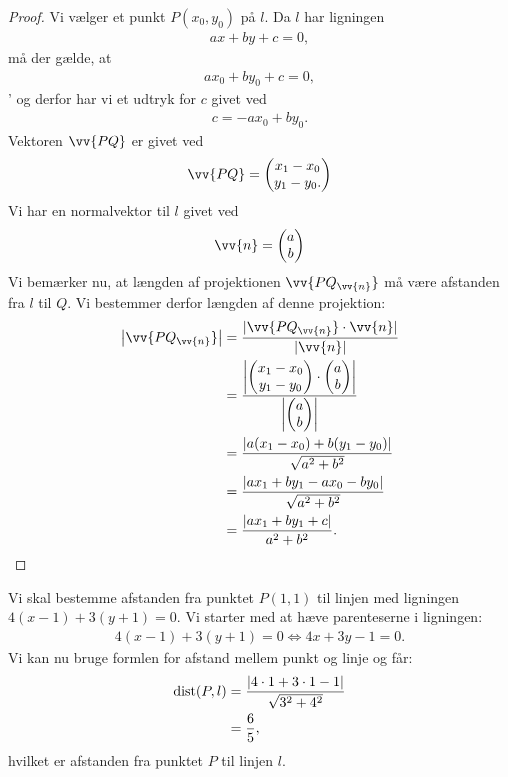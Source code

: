 \begin{proof}
Vi vælger et punkt  $P(x_0,y_0)$ på $l$. Da $l$ har ligningen
\begin{align*}
ax+by+c = 0, 
\end{align*}
må der gælde, at 
\begin{align*}
ax_0+by_0+c = 0, 
\end{align*}'
og derfor har vi et udtryk for $c$ givet ved
\begin{align*}
c = -ax_0+by_0.
\end{align*}
Vektoren $\vv{PQ}$ er givet ved
\begin{align*}
\vv{PQ} = \begin{pmatrix}
x_1 - x_0 \\ y_1 - y_0.
\end{pmatrix}
\end{align*}
Vi har en normalvektor til $l$ givet ved 
\begin{align*}
\vv{n}=
\begin{pmatrix}
a \\ b
\end{pmatrix}
\end{align*}
Vi bemærker nu, at længden af projektionen $\vv{PQ_{\vv{n}}}$ må være afstanden fra $l$ til $Q$. Vi bestemmer derfor længden af denne projektion:
\begin{align*}
\left|\vv{PQ_{\vv{n}}}\right| &= \frac{|\vv{PQ_{\vv{n}}}\cdot \vv{n}|}{|\vv{n}|} \\ 
&= \frac{\left|\begin{pmatrix}
x_1-x_0 \\ y_1 - y_0
\end{pmatrix}\cdot \begin{pmatrix}
a \\ b
\end{pmatrix} \right|}{\left|\begin{pmatrix}
a \\ b
\end{pmatrix}\right|}\\
&=\frac{|a(x_1-x_0)+b(y_1-y_0)|}{\sqrt{a^2+b^2}}\\
&= \frac{|ax_1+by_1 -ax_0-by_0|}{\sqrt{a^2+b^2}}\\
&= \frac{|ax_1+by_1+c|}{a^2+b^2}.
\end{align*}
\end{proof}


\begin{exa}
Vi skal bestemme afstanden fra punktet $P(1,1)$ til linjen med ligningen $4(x-1) + 3(y+1) = 0$. Vi starter med at hæve parenteserne i ligningen:
\begin{align*}
4(x-1) + 3(y+1) = 0 \Leftrightarrow 4x+3y-1 = 0.
\end{align*}
Vi kan nu bruge formlen for afstand mellem punkt og linje og får:
\begin{align*}
\textnormal{dist}(P,l) &= \frac{|4\cdot 1 + 3\cdot 1-1|}{\sqrt{3^2+4^2}}\\
&=\frac{6}{5},
\end{align*}
hvilket er afstanden fra punktet $P$ til linjen $l$. 
\end{exa}

